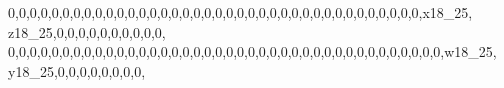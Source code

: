 \documentclass[]{article}
\newenvironment{Shaded}{\begin{snugshade}}{\end{snugshade}}
\newcommand{\DecValTok}[1]{\textcolor[rgb]{0.00,0.00,0.81}{#1}}
\newcommand{\NormalTok}[1]{#1}
\begin{document}
\begin{Shaded}
\begin{Highlighting}[]
\DecValTok{0}\NormalTok{,}\DecValTok{0}\NormalTok{,}\DecValTok{0}\NormalTok{,}\DecValTok{0}\NormalTok{,}\DecValTok{0}\NormalTok{,}\DecValTok{0}\NormalTok{,}\DecValTok{0}\NormalTok{,}\DecValTok{0}\NormalTok{,}\DecValTok{0}\NormalTok{,}\DecValTok{0}\NormalTok{,}\DecValTok{0}\NormalTok{,}\DecValTok{0}\NormalTok{,}\DecValTok{0}\NormalTok{,}\DecValTok{0}\NormalTok{,}\DecValTok{0}\NormalTok{,}\DecValTok{0}\NormalTok{,}\DecValTok{0}\NormalTok{,}\DecValTok{0}\NormalTok{,}\DecValTok{0}\NormalTok{,}\DecValTok{0}\NormalTok{,}\DecValTok{0}\NormalTok{,}\DecValTok{0}\NormalTok{,}\DecValTok{0}\NormalTok{,}\DecValTok{0}\NormalTok{,}\DecValTok{0}\NormalTok{,}\DecValTok{0}\NormalTok{,}\DecValTok{0}\NormalTok{,}\DecValTok{0}\NormalTok{,}\DecValTok{0}\NormalTok{,}\DecValTok{0}\NormalTok{,}\DecValTok{0}\NormalTok{,}\DecValTok{0}\NormalTok{,}\DecValTok{0}\NormalTok{,}\DecValTok{0}\NormalTok{,}\DecValTok{0}\NormalTok{,}\DecValTok{0}\NormalTok{,}\DecValTok{0}\NormalTok{,}\DecValTok{0}\NormalTok{,x18_}\DecValTok{25}\NormalTok{, z18_}\DecValTok{25}\NormalTok{,}\DecValTok{0}\NormalTok{,}\DecValTok{0}\NormalTok{,}\DecValTok{0}\NormalTok{,}\DecValTok{0}\NormalTok{,}\DecValTok{0}\NormalTok{,}\DecValTok{0}\NormalTok{,}\DecValTok{0}\NormalTok{,}\DecValTok{0}\NormalTok{,}\DecValTok{0}\NormalTok{,}\DecValTok{0}\NormalTok{,}
\DecValTok{0}\NormalTok{,}\DecValTok{0}\NormalTok{,}\DecValTok{0}\NormalTok{,}\DecValTok{0}\NormalTok{,}\DecValTok{0}\NormalTok{,}\DecValTok{0}\NormalTok{,}\DecValTok{0}\NormalTok{,}\DecValTok{0}\NormalTok{,}\DecValTok{0}\NormalTok{,}\DecValTok{0}\NormalTok{,}\DecValTok{0}\NormalTok{,}\DecValTok{0}\NormalTok{,}\DecValTok{0}\NormalTok{,}\DecValTok{0}\NormalTok{,}\DecValTok{0}\NormalTok{,}\DecValTok{0}\NormalTok{,}\DecValTok{0}\NormalTok{,}\DecValTok{0}\NormalTok{,}\DecValTok{0}\NormalTok{,}\DecValTok{0}\NormalTok{,}\DecValTok{0}\NormalTok{,}\DecValTok{0}\NormalTok{,}\DecValTok{0}\NormalTok{,}\DecValTok{0}\NormalTok{,}\DecValTok{0}\NormalTok{,}\DecValTok{0}\NormalTok{,}\DecValTok{0}\NormalTok{,}\DecValTok{0}\NormalTok{,}\DecValTok{0}\NormalTok{,}\DecValTok{0}\NormalTok{,}\DecValTok{0}\NormalTok{,}\DecValTok{0}\NormalTok{,}\DecValTok{0}\NormalTok{,}\DecValTok{0}\NormalTok{,}\DecValTok{0}\NormalTok{,}\DecValTok{0}\NormalTok{,}\DecValTok{0}\NormalTok{,}\DecValTok{0}\NormalTok{,}\DecValTok{0}\NormalTok{,}\DecValTok{0}\NormalTok{,w18_}\DecValTok{25}\NormalTok{, y18_}\DecValTok{25}\NormalTok{,}\DecValTok{0}\NormalTok{,}\DecValTok{0}\NormalTok{,}\DecValTok{0}\NormalTok{,}\DecValTok{0}\NormalTok{,}\DecValTok{0}\NormalTok{,}\DecValTok{0}\NormalTok{,}\DecValTok{0}\NormalTok{,}\DecValTok{0}\NormalTok{,}

\end{Highlighting}
\end{Shaded}
\end{document}
